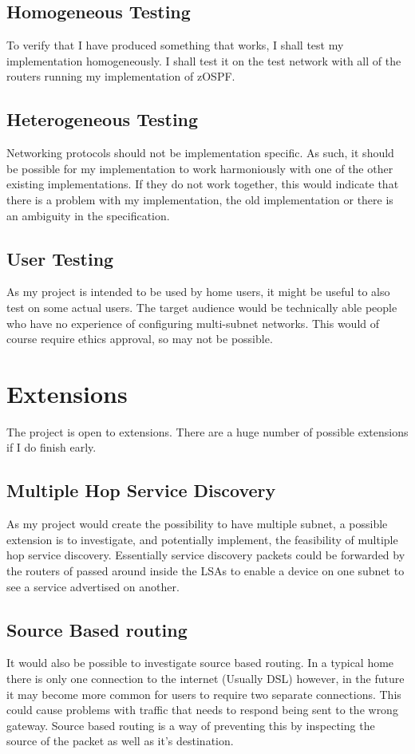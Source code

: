 \documentclass[12pt]{report}
\begin{document}
\subsection{Homogeneous Testing}
To verify that I have produced something that works, I shall test my
implementation homogeneously. I shall test it on the test network with all of
the routers running my implementation of zOSPF. 

\subsection{Heterogeneous Testing}
Networking protocols should not be implementation specific. As such, it should
be possible for my implementation to work harmoniously with one of the other
existing implementations. If they do not work together, this would indicate that
there is a problem with my implementation, the old implementation or there is an
ambiguity in the specification.

\subsection{User Testing}
As my project is intended to be used by home users, it might be useful to also
test on some actual users. The target audience would be technically able people
who have no experience of configuring multi-subnet networks. This would of course 
require ethics approval, so may not be possible.

\section{Extensions}
The project is open to extensions.  There are a huge number of possible
extensions if I do finish early.

\subsection{Multiple Hop Service Discovery}
As my project would create the possibility to have multiple subnet, a possible
extension is to investigate, and potentially implement, the feasibility of
multiple hop service discovery. Essentially service discovery packets could be
forwarded by the routers of passed around inside the LSAs to enable a device on
one subnet to see a service advertised on another.

\subsection{Source Based routing}
It would also be possible to investigate source based routing. In a typical home
there is only one connection to the internet (Usually DSL) however, in the
future it may become more common for users to require two separate connections.
This could cause problems with traffic that needs to respond being sent to the
wrong gateway. Source based routing is a way of preventing this by inspecting
the source of the packet as well as it's destination.
\end{document}
